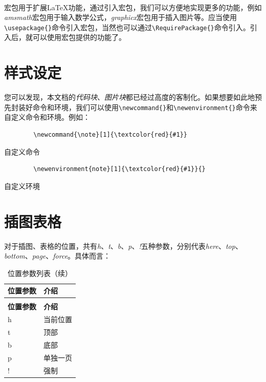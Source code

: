 \;\\

宏包用于扩展\LaTeX{}功能，通过引入宏包，我们可以方便地实现更多的功能，例如\textit{amsmath}宏包用于输入数学公式，\textit{graphicx}宏包用于插入图片等。应当使用\verb|\usepackage{}|命令引入宏包，当然也可以通过\verb|\RequirePackage{}|命令引入。引入后，就可以使用宏包提供的功能了。\\

\section{样式设定}

您可以发现，本文档的\textit{代码块}、\textit{图片块}都已经过高度的客制化。如果想要如此地预先封装好命令和环境，我们可以使用\verb|\newcommand{}|和\verb|\newenvironment{}|命令来自定义命令和环境。例如：

\begin{longlisting}
    \begin{verbatim}
        \newcommand{\note}[1]{\textcolor{red}{#1}}
    \end{verbatim}
    \caption{自定义命令}
    \label{listing:newcommand}
\end{longlisting}

\begin{longlisting}
    \begin{verbatim}
        \newenvironment{note}[1]{\textcolor{red}{#1}}{}
    \end{verbatim}
    \caption{自定义环境}
    \label{listing:newenvironment}
\end{longlisting}

\section{插图表格}

对于插图、表格的位置，共有\textit{h}、\textit{t}、\textit{b}、\textit{p}、\textit{!}五种参数，分别代表\textit{here}、\textit{top}、\textit{bottom}、\textit{page}、\textit{force}。具体而言：

\begin{longtable}{p{3cm}<{\centering}|p{11cm}<{\centering}}
    \caption{位置参数列表} \label{tab:git-local-operations} \\
    \toprule
        \textbf{位置参数} & \textbf{介绍} \\
    \midrule
    \endfirsthead
    \caption[]{位置参数列表（续）} \\
    \toprule
        \textbf{位置参数} & \textbf{介绍} \\
    \midrule
    \endhead
    \midrule
    \endfoot
    \bottomrule
    \endlastfoot
        h & 当前位置 \\
        t & 顶部 \\
        b & 底部 \\
        p & 单独一页 \\
        ! & 强制 \\
\end{longtable}

